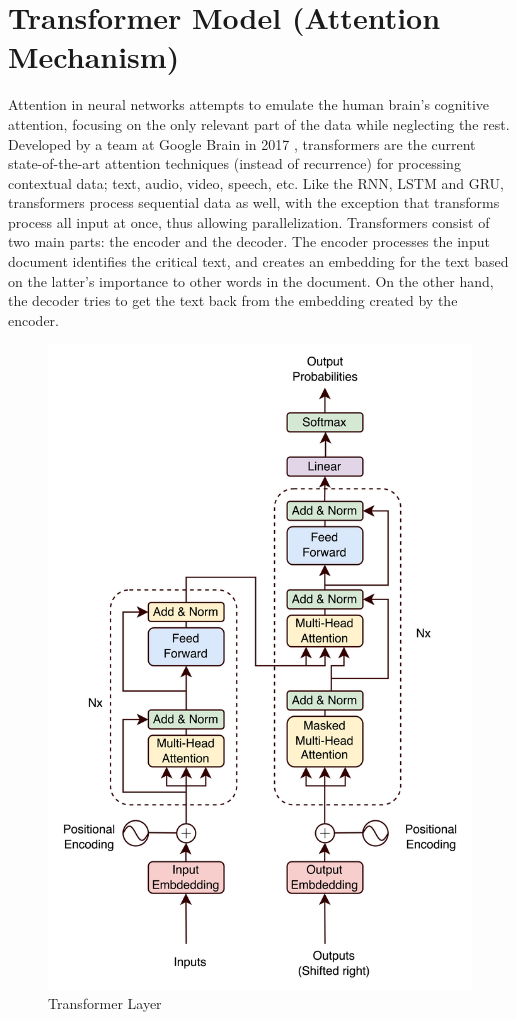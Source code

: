 \section{Transformer Model (Attention Mechanism)}
\label{section: transformers}
Attention in neural networks attempts to emulate the human brain's cognitive attention, focusing on the only relevant part of the data while neglecting the rest. Developed by a team at Google Brain in 2017 \cite{Vaswani2017}, transformers are the current state-of-the-art attention techniques (instead of recurrence) for processing contextual data; text, audio, video, speech, etc. Like the RNN, LSTM and GRU, transformers process sequential data as well, with the exception that transforms process all input at once, thus allowing parallelization. Transformers consist of two main parts: the encoder and the decoder. The encoder processes the input document identifies the critical text, and creates an embedding for the text based on the latter's importance to other words in the document. On the other hand, the decoder tries to get the text back from the embedding created by the encoder.
\begin{figure}[H]
    \centering
    \includegraphics[scale=1.1]{CHAPTER_4/c4_fig_transformer_layer_draw.png}
    \caption{Transformer Layer \protect\cite{Vaswani2017}}
    \label{TRANSFORMER_LAYER}
  \end{figure}
